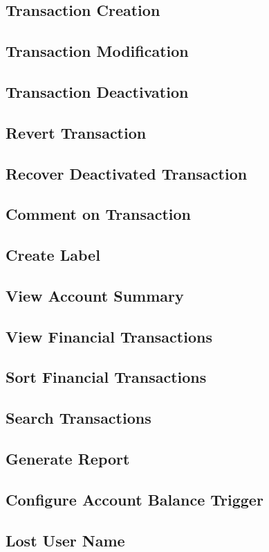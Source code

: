 \documentclass{article}
\begin{document}
\subsection{Transaction Creation}
\subsection{Transaction Modification}
\subsection{Transaction Deactivation}
\subsection{Revert Transaction}
\subsection{Recover Deactivated Transaction}
\subsection{Comment on Transaction}
\subsection{Create Label}
\subsection{View Account Summary}
\subsection{View Financial Transactions}
\subsection{Sort Financial Transactions}
\subsection{Search Transactions}
\subsection{Generate Report}
\subsection{Configure Account Balance Trigger}
\subsection{Lost User Name}
\end{document}
